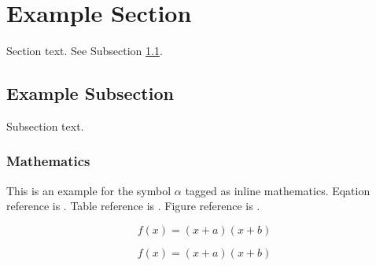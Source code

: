
\section{Example Section}
\label{sec1}

Section text. See Subsection \ref{subsec1}.

\subsection{Example Subsection}
\label{subsec1}

Subsection text.


\subsubsection{Mathematics}
This is an example for the symbol $\alpha$ tagged as inline mathematics.
Eqation reference is .
Table reference is .
Figure reference is .

\begin{equation}
f(x) = (x+a)(x+b) \label{eq1}
\end{equation}

\begin{equation*}
f(x) = (x+a)(x+b)
\end{equation*}

